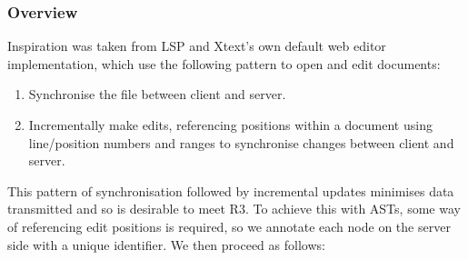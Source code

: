 \documentclass{article}
\begin{document}
\subsubsection{Overview}
Inspiration was taken from LSP and Xtext's own default web editor implementation, which use the following pattern to open and edit documents:
\begin{enumerate}
\item Synchronise the file between client and server.
\item Incrementally make edits, referencing positions within a document using line/position numbers and ranges to synchronise changes between client and server. 
\end{enumerate}
%
This pattern of synchronisation followed by incremental updates minimises data transmitted and so is desirable to meet R3. To achieve this with ASTs, some way of referencing edit positions is required, so we annotate each node on the server side with a unique identifier. We then proceed as follows:
\end{document}
